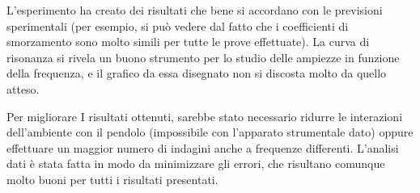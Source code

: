 L'esperimento ha creato dei risultati che bene si accordano con le previsioni sperimentali (per esempio, si può vedere dal fatto
 che i coefficienti di smorzamento sono molto simili per tutte le prove effettuate). La curva di risonanza si rivela un buono
 strumento per lo studio delle ampiezze in funzione della frequenza, e il grafico da essa disegnato non si discosta molto da quello atteso.
 
 Per migliorare I risultati ottenuti, sarebbe stato necessario ridurre le interazioni dell'ambiente con il pendolo (impossibile con
 l'apparato strumentale dato) oppure effettuare un maggior numero di indagini anche a frequenze differenti.
 L'analisi dati è stata fatta in modo da minimizzare gli errori, che risultano comunque molto buoni per tutti i risultati presentati.
